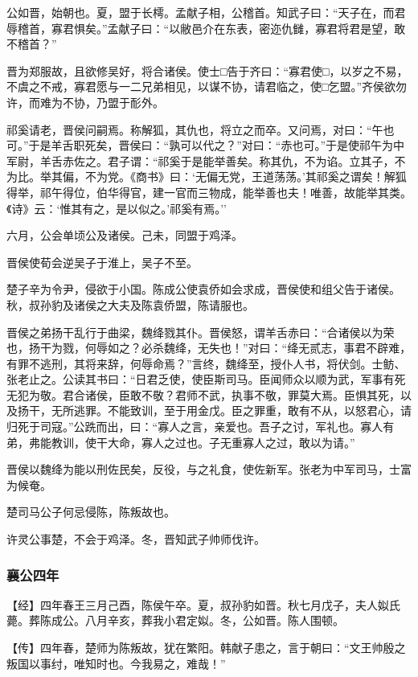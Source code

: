 \documentclass[]{article}
\begin{document}
公如晋，始朝也。夏，盟于长樗。孟献子相，公稽首。知武子曰：``天子在，而君辱稽首，寡君惧矣。''孟献子曰：``以敝邑介在东表，密迩仇雠，寡君将君是望，敢不稽首？''

晋为郑服故，且欲修吴好，将合诸侯。使士□告于齐曰：``寡君使□，以岁之不易，不虞之不戒，寡君愿与一二兄弟相见，以谋不协，请君临之，使□乞盟。''齐侯欲勿许，而难为不协，乃盟于耏外。

祁奚请老，晋侯问嗣焉。称解狐，其仇也，将立之而卒。又问焉，对曰：``午也可。''于是羊舌职死矣，晋侯曰：``孰可以代之？''对曰：``赤也可。''于是使祁午为中军尉，羊舌赤佐之。君子谓：``祁奚于是能举善矣。称其仇，不为谄。立其子，不为比。举其偏，不为党。《商书》曰：`无偏无党，王道荡荡。'其祁奚之谓矣！解狐得举，祁午得位，伯华得官，建一官而三物成，能举善也夫！唯善，故能举其类。《诗》云：`惟其有之，是以似之。'祁奚有焉。''

六月，公会单顷公及诸侯。己未，同盟于鸡泽。

晋侯使荀会逆吴子于淮上，吴子不至。

楚子辛为令尹，侵欲于小国。陈成公使袁侨如会求成，晋侯使和组父告于诸侯。秋，叔孙豹及诸侯之大夫及陈袁侨盟，陈请服也。

晋侯之弟扬干乱行于曲梁，魏绛戮其仆。晋侯怒，谓羊舌赤曰：``合诸侯以为荣也，扬干为戮，何辱如之？必杀魏绛，无失也！''对曰：``绛无贰志，事君不辟难，有罪不逃刑，其将来辞，何辱命焉？''言终，魏绛至，授仆人书，将伏剑。士鲂、张老止之。公读其书曰：``日君乏使，使臣斯司马。臣闻师众以顺为武，军事有死无犯为敬。君合诸侯，臣敢不敬？君师不武，执事不敬，罪莫大焉。臣惧其死，以及扬干，无所逃罪。不能致训，至于用金戊。臣之罪重，敢有不从，以怒君心，请归死于司寇。''公跣而出，曰：``寡人之言，亲爱也。吾子之讨，军礼也。寡人有弟，弗能教训，使干大命，寡人之过也。子无重寡人之过，敢以为请。''

晋侯以魏绛为能以刑佐民矣，反役，与之礼食，使佐新军。张老为中军司马，士富为候奄。

楚司马公子何忌侵陈，陈叛故也。

许灵公事楚，不会于鸡泽。冬，晋知武子帅师伐许。

\hypertarget{header-n1846}{%
\subsubsection{襄公四年}\label{header-n1846}}

【经】四年春王三月己酉，陈侯午卒。夏，叔孙豹如晋。秋七月戊子，夫人姒氏薨。葬陈成公。八月辛亥，葬我小君定姒。冬，公如晋。陈人围顿。

【传】四年春，楚师为陈叛故，犹在繁阳。韩献子患之，言于朝曰：``文王帅殷之叛国以事纣，唯知时也。今我易之，难哉！''
\end{document}
